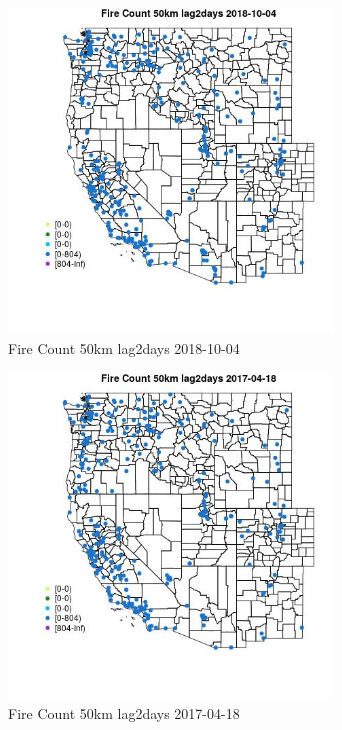 \begin{figure} 
\centering  
\includegraphics[width=0.77\textwidth]{Code_Outputs/Report_ML_input_PM25_Step4_part_f_de_duplicated_aveswNAs_MapObsFire_Count_50km_lag2days2018-10-04.jpg} 
\caption{\label{fig:Report_ML_input_PM25_Step4_part_f_de_duplicated_aveswNAsMapObsFire_Count_50km_lag2days2018-10-04}Fire Count 50km lag2days 2018-10-04} 
\end{figure} 
 

\begin{figure} 
\centering  
\includegraphics[width=0.77\textwidth]{Code_Outputs/Report_ML_input_PM25_Step4_part_f_de_duplicated_aveswNAs_MapObsFire_Count_50km_lag2days2017-04-18.jpg} 
\caption{\label{fig:Report_ML_input_PM25_Step4_part_f_de_duplicated_aveswNAsMapObsFire_Count_50km_lag2days2017-04-18}Fire Count 50km lag2days 2017-04-18} 
\end{figure} 
 

